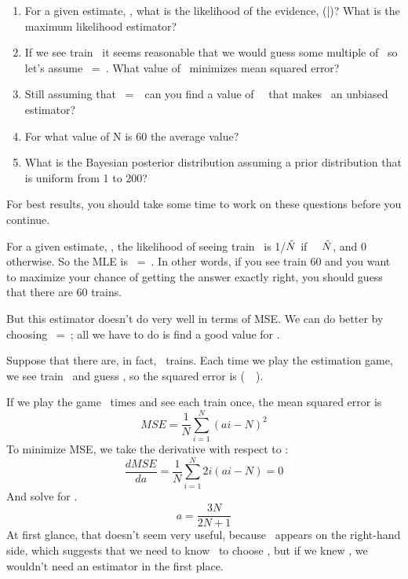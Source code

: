 \documentclass[12pt]{book}
\begin{document}
\begin{enumerate}

\item For a given estimate, \mynhat, what is the likelihood of the
  evidence, \Prob(\E|\mynhat)?  What is the maximum likelihood estimator?

\item If we see train \ii~it seems reasonable that we would guess
  some multiple of \ii~so let's assume \mynhat~=~\mya \ii.  What value of
  \mya~minimizes mean squared error?

\item Still assuming that \mynhat~=~\mya \ii~can you find a value of \
\mya~that makes \mynhat~an unbiased estimator?

\item For what value of N is 60 the average value?

\item What is the Bayesian posterior distribution assuming a prior
distribution that is uniform from 1 to 200?

\end{enumerate}

For best results, you should take some time to work on these questions
before you continue.

For a given estimate, \mynhat, the likelihood of seeing train \ii~is
1/$\hat{N}$ if \ii~\myle~$\hat{N}$, and 0 otherwise.  So the MLE is 
\mynhat~=~\ii.  
In other words, if you see train 60 and you want to maximize your
chance of getting the answer exactly right, you should guess that there
are 60 trains.

But this estimator doesn't do very well in terms of MSE.  We can do
better by choosing \mynhat~=~\mya\ii; all we have to do is find a good
value for \mya.

Suppose that there are, in fact, \N~trains.  Each time we play
the estimation game, we see train \ii~and guess \mya\ii, so the squared
error is (\mya\ii~\minus~\N)\super{2}.

If we play the game \N~times and see each train once, the mean
squared error is 
%
\[ MSE = \frac{1}{N} \sum_{i=1}^N (ai - N)^2 \]
%
To minimize MSE, we take the derivative with respect to \mya:
%
\[ \frac{d MSE}{da} = \frac{1}{N} \sum_{i=1}^N 2i (ai - N) = 0 \]
%
And solve for \mya.
%
\[ a = \frac{3N}{2N+1} \]
%
At first glance, that doesn't seem very useful, because \N~appears on
the right-hand side, which suggests that we need to know \N~to choose
\mya, but if we knew \N, we wouldn't need an estimator in the first place.
\end{document}
